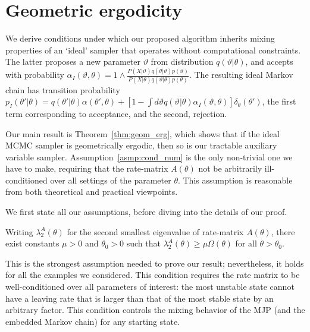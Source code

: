 \newpage
\section{Geometric ergodicity}
We derive conditions under which our proposed algorithm
inherits mixing properties of an `ideal' sampler that operates without
computational constraints. The latter proposes a new parameter $\vartheta$
from distribution $q(\vartheta|\theta)$, and accepts with probability 
$\alpha_I(\vartheta,\theta) = 1 \wedge \frac{P(X | \vartheta)q(\theta| \vartheta)p(\vartheta)}
      {P(X | \theta)q(\vartheta|\theta)p(\theta)}$. The resulting ideal
Markov chain has transition probability 
$p_I(\theta'|\theta) = q(\theta'|\theta)\alpha(\theta',\theta) + \left[1-\int d\vartheta
q(\vartheta|\theta)\alpha_I(\vartheta,\theta)\right]\delta_\theta(\theta')$, the first
term corresponding to acceptance, and the second, rejection.

Our main result is Theorem~\ref{thm:geom_erg}, which shows that if the ideal MCMC 
sampler is geometrically ergodic, then so is our tractable auxiliary
variable sampler. Assumption~\ref{asmp:cond_num} is the only non-trivial 
one we have to make, requiring that the rate-matrix $A(\theta)$ not be 
arbitrarily ill-conditioned over all
settings of the parameter $\theta$. This assumption is reasonable from
both theoretical and practical viewpoints.

We first state all our assumptions, before diving into the details
of our proof.
\begin{assumption}
	Writing $\lambda ^A_2(\theta)$ for the second smallest eigenvalue of 
    rate-matrix  $A(\theta)$, there exist constants $\mu > 0$ and $\theta_0 > 0$ 
    such that $ \lambda ^A_2(\theta) \geq \mu \Omega(\theta)$
   for all $\theta > \theta_0$.
  \label{asmp:cond_num}
\end{assumption}
\noindent This is the strongest assumption needed to prove our result; 
nevertheless, it holds for all the examples we considered. This condition requires the rate 
matrix to be well-conditioned over all parameters of interest: the most 
unstable state cannot have a leaving rate that is larger than that of
the most stable state by an arbitrary factor. This condition controls the
mixing behavior of the MJP (and the embedded Markov chain) for any 
starting state. 

